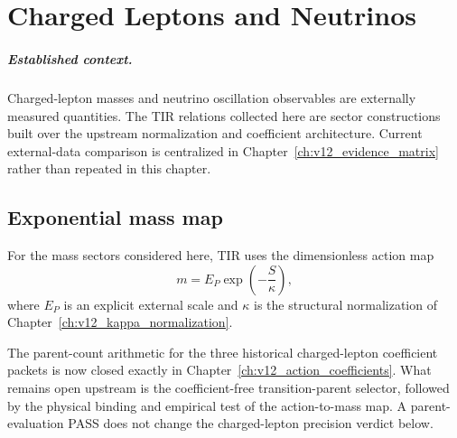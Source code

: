 \chapter{Charged Leptons and Neutrinos}
\label{ch:v12_leptons_neutrinos}

\paragraph{Established context.}
Charged-lepton masses and neutrino oscillation observables are externally
measured quantities. The TIR relations collected here are sector constructions
built over the upstream normalization and coefficient architecture. Current
external-data comparison is centralized in Chapter~\ref{ch:v12_evidence_matrix}
rather than repeated in this chapter.

\section{Exponential mass map}
For the mass sectors considered here, TIR uses the dimensionless action map
\begin{equation}
\boxed{
m=E_P\exp\!\left(-\frac{S}{\kappa}\right),
}
\label{eq:v12-exponential-mass-map}
\end{equation}
where $E_P$ is an explicit external scale and $\kappa$ is the structural
normalization of Chapter~\ref{ch:v12_kappa_normalization}.

The parent-count arithmetic for the three historical charged-lepton coefficient
packets is now closed exactly in
Chapter~\ref{ch:v12_action_coefficients}. What remains open upstream is the
coefficient-free transition-parent selector, followed by the physical binding
and empirical test of the action-to-mass map. A parent-evaluation PASS does not
change the charged-lepton precision verdict below.

